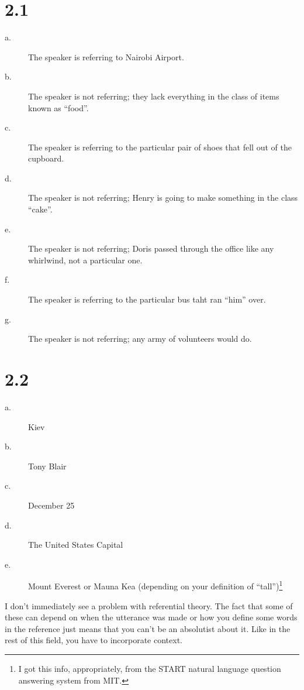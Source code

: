 \documentclass[12pt]{article}
\begin{document}
\section*{2.1}
\begin{description}
\item[a.] The speaker is referring to Nairobi Airport.
\item[b.] The speaker is not referring; they lack everything in the
class of items known as ``food''.
\item[c.] The speaker is referring to the particular pair of shoes that
fell out of the cupboard.
\item[d.] The speaker is not referring; Henry is going to make something
in the class ``cake''.
\item[e.] The speaker is not referring; Doris passed through the office
like any whirlwind, not a particular one.
\item[f.] The speaker is referring to the particular bus taht ran
``him'' over.
\item[g.] The speaker is not referring; any army of volunteers would do.
\end{description}

\section*{2.2}
\begin{description}
\item[a.] Kiev
\item[b.] Tony Blair
\item[c.] December 25
\item[d.] The United States Capital
\item[e.] Mount Everest or Mauna Kea (depending on your definition of
``tall'')\footnote{I got this info, appropriately, from the START
natural language question answering system from MIT.}
\end{description}

I don't immediately see a problem with referential theory.  The fact
that some of these can depend on when the utterance was made or how you
define some words in the reference just means that you can't be an
absolutist about it.  Like in the rest of this field, you have to
incorporate context.
\end{document}
